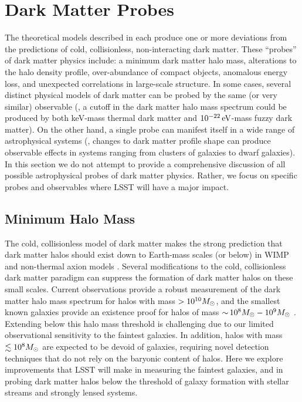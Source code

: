 \documentclass[modern,linenumbers]{aastex62}
\begin{document}
\section{Dark Matter Probes}
\label{sec:probes}

The theoretical models described in  each produce one or more deviations from the predictions of cold, collisionless, non-interacting dark matter.
These ``probes'' of dark matter physics include: a minimum dark matter halo mass, alterations to the halo density profile, over-abundance of compact objects, anomalous energy loss, and unexpected correlations in large-scale structure.
In some cases, several distinct physical models of dark matter can be probed by the same (or very similar) observable (\eg, a cutoff in the dark matter halo mass spectrum could be produced by both keV-mass thermal dark matter and $10^{-22}\mathrm{\,eV}$-mass fuzzy dark matter). 
On the other hand, a single probe can manifest itself in a wide range of astrophysical systems (\eg, changes to dark matter profile shape can produce observable effects in systems ranging from clusters of galaxies to dwarf galaxies).
In this section we do not attempt to provide a comprehensive discussion of all possible astrophysical probes of dark matter physics.
Rather, we focus on specific probes and observables where LSST will have a major impact.

\subsection{Minimum Halo Mass}
\label{sec:halo_mass}

The cold, collisionless model of dark matter makes the strong prediction that dark matter halos should exist down to Earth-mass scales (or below) in WIMP and non-thermal axion models \citep{Green:2003un,1412.5930}.
Several modifications to the cold, collisionless dark matter paradigm can suppress the formation of dark matter halos on these small scales.
Current observations provide a robust measurement of the dark matter halo mass spectrum for halos with mass $> 10^{10}M_\odot$, and the smallest known galaxies provide an existence proof for halos of mass $ {\sim}\, 10^8 M_\odot - 10^9 M_\odot$ \citep{behroozi2018,Jethwa:2018,Kim:2017iwr,Nadler:2018}. 
Extending below this halo mass threshold is challenging due to our limited observational sensitivity to the faintest galaxies.
In addition, halos with mass $\lesssim 10^8 M_\odot$ are expected to be devoid of galaxies, requiring novel detection techniques that do not rely on the baryonic content of halos.
Here we explore improvements that LSST will make in measuring the faintest galaxies, and in probing dark matter halos below the threshold of galaxy formation with stellar streams and strongly lensed systems.
\end{document}
